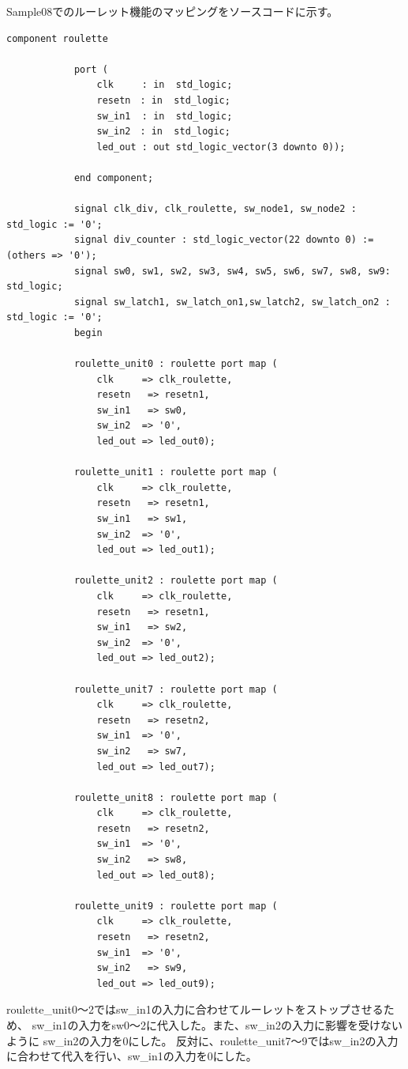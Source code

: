 \documentclass{ltjsarticle}
\begin{document}
			Sample08でのルーレット機能のマッピングをソースコードに示す。
			\begin{lstlisting}[caption = Sample08.vhd::ルーレット機能のマッピング, label = code:rouletteMap]
			component roulette
			
			port (
				clk     : in  std_logic;
				resetn　: in  std_logic;
				sw_in1  : in  std_logic;
				sw_in2　: in  std_logic;
				led_out : out std_logic_vector(3 downto 0));

			end component;

			signal clk_div, clk_roulette, sw_node1, sw_node2 : std_logic := '0';
			signal div_counter : std_logic_vector(22 downto 0) := (others => '0');
			signal sw0, sw1, sw2, sw3, sw4, sw5, sw6, sw7, sw8, sw9: std_logic;
			signal sw_latch1, sw_latch_on1,sw_latch2, sw_latch_on2 : std_logic := '0';
			begin

			roulette_unit0 : roulette port map (
				clk     => clk_roulette,
				resetn   => resetn1,
				sw_in1   => sw0,
				sw_in2  => '0',
				led_out => led_out0);
			
			roulette_unit1 : roulette port map (
				clk     => clk_roulette,
				resetn   => resetn1,
				sw_in1   => sw1,
				sw_in2  => '0',
				led_out => led_out1);
			
			roulette_unit2 : roulette port map (
				clk     => clk_roulette,
				resetn   => resetn1,
				sw_in1   => sw2,
				sw_in2  => '0',
				led_out => led_out2);
			
			roulette_unit7 : roulette port map (
				clk     => clk_roulette,
				resetn   => resetn2,
				sw_in1  => '0',
				sw_in2   => sw7,
				led_out => led_out7);
			
			roulette_unit8 : roulette port map (
				clk     => clk_roulette,
				resetn   => resetn2,
				sw_in1  => '0',
				sw_in2   => sw8,
				led_out => led_out8);
				
			roulette_unit9 : roulette port map (
				clk     => clk_roulette,
				resetn   => resetn2,
				sw_in1  => '0',
				sw_in2   => sw9,
				led_out => led_out9);
			\end{lstlisting}

		roulette\_unit0〜2ではsw\_in1の入力に合わせてルーレットをストップさせるため、
		sw\_in1の入力をsw0〜2に代入した。また、sw\_in2の入力に影響を受けないように
		sw\_in2の入力を0にした。
		反対に、roulette\_unit7〜9ではsw\_in2の入力に合わせて代入を行い、sw\_in1の入力を0にした。
\end{document}
